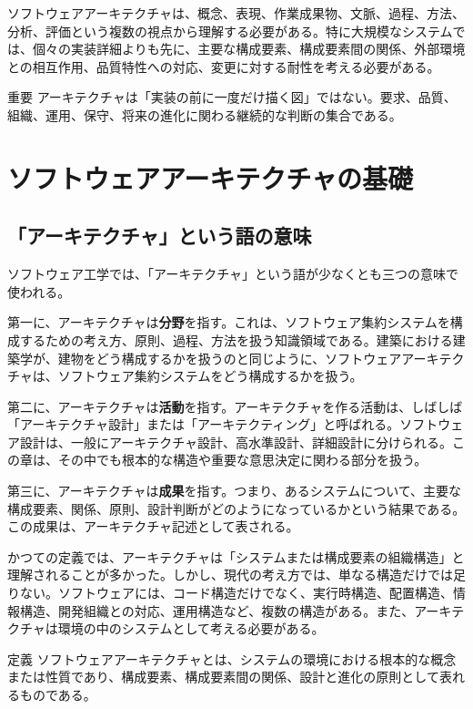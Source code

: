 \documentclass[a4paper,11pt]{ltjsarticle}
\newcommand{\keyterm}[1]{\textbf{#1}}
\begin{document}
ソフトウェアアーキテクチャは、概念、表現、作業成果物、文脈、過程、方法、分析、評価という複数の視点から理解する必要がある。特に大規模なシステムでは、個々の実装詳細よりも先に、主要な構成要素、構成要素間の関係、外部環境との相互作用、品質特性への対応、変更に対する耐性を考える必要がある。

\begin{statementbox}{重要}
アーキテクチャは「実装の前に一度だけ描く図」ではない。要求、品質、組織、運用、保守、将来の進化に関わる継続的な判断の集合である。
\end{statementbox}

\section{ソフトウェアアーキテクチャの基礎}

\subsection{「アーキテクチャ」という語の意味}
ソフトウェア工学では、「アーキテクチャ」という語が少なくとも三つの意味で使われる。

第一に、アーキテクチャは\keyterm{分野}を指す。これは、ソフトウェア集約システムを構成するための考え方、原則、過程、方法を扱う知識領域である。建築における建築学が、建物をどう構成するかを扱うのと同じように、ソフトウェアアーキテクチャは、ソフトウェア集約システムをどう構成するかを扱う。

第二に、アーキテクチャは\keyterm{活動}を指す。アーキテクチャを作る活動は、しばしば「アーキテクチャ設計」または「アーキテクティング」と呼ばれる。ソフトウェア設計は、一般にアーキテクチャ設計、高水準設計、詳細設計に分けられる。この章は、その中でも根本的な構造や重要な意思決定に関わる部分を扱う。

第三に、アーキテクチャは\keyterm{成果}を指す。つまり、あるシステムについて、主要な構成要素、関係、原則、設計判断がどのようになっているかという結果である。この成果は、アーキテクチャ記述として表される。

かつての定義では、アーキテクチャは「システムまたは構成要素の組織構造」と理解されることが多かった。しかし、現代の考え方では、単なる構造だけでは足りない。ソフトウェアには、コード構造だけでなく、実行時構造、配置構造、情報構造、開発組織との対応、運用構造など、複数の構造がある。また、アーキテクチャは環境の中のシステムとして考える必要がある。

\begin{statementbox}{定義}
ソフトウェアアーキテクチャとは、システムの環境における根本的な概念または性質であり、構成要素、構成要素間の関係、設計と進化の原則として表れるものである。
\end{statementbox}
\end{document}
